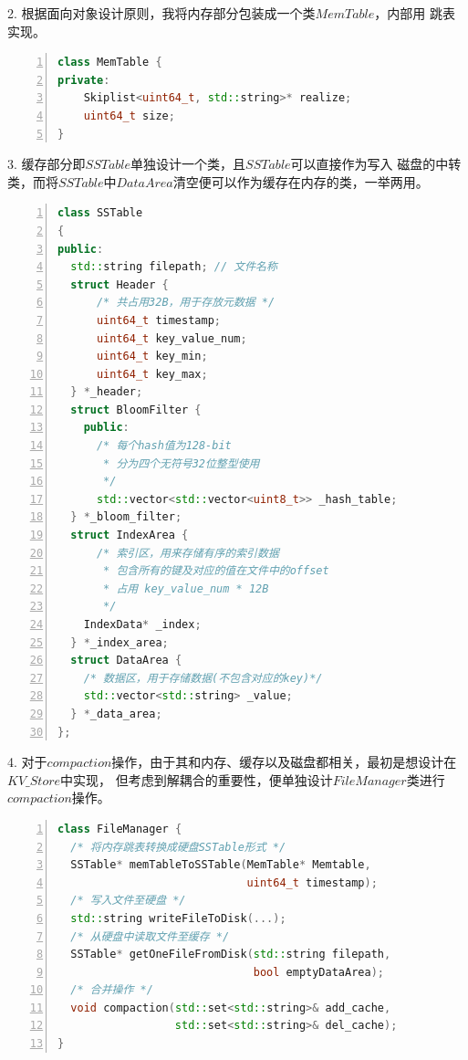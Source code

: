 \documentclass{article}
\begin{document}
2. 根据面向对象设计原则，我将内存部分包装成一个类$MemTable$，内部用
跳表实现。
\begin{lstlisting}[language = C++, numbers=left, 
  numberstyle=\tiny, frame=single]
class MemTable {
private:
    Skiplist<uint64_t, std::string>* realize;
    uint64_t size;
}
\end{lstlisting}

3. 缓存部分即$SSTable$单独设计一个类，且$SSTable$可以直接作为写入
磁盘的中转类，而将$SSTable$中$DataArea$清空便可以作为缓存在内存的类，一举两用。
\begin{lstlisting}[language = C++, numbers=left, 
  numberstyle=\tiny,frame=single]
class SSTable
{
public:
  std::string filepath; // 文件名称
  struct Header {
      /* 共占用32B，用于存放元数据 */
      uint64_t timestamp;
      uint64_t key_value_num;
      uint64_t key_min;
      uint64_t key_max;
  } *_header;
  struct BloomFilter {
    public:
      /* 每个hash值为128-bit
       * 分为四个无符号32位整型使用
       */
      std::vector<std::vector<uint8_t>> _hash_table;
  } *_bloom_filter;
  struct IndexArea {
      /* 索引区，用来存储有序的索引数据
       * 包含所有的键及对应的值在文件中的offset
       * 占用 key_value_num * 12B
       */
    IndexData* _index;
  } *_index_area;
  struct DataArea {
    /* 数据区，用于存储数据(不包含对应的key)*/
    std::vector<std::string> _value;
  } *_data_area;
};
\end{lstlisting}

4. 对于$compaction$操作，由于其和内存、缓存以及磁盘都相关，最初是想设计在$KV\_Store$中实现，
但考虑到解耦合的重要性，便单独设计$FileManager$类进行$compaction$操作。
\begin{lstlisting}[language = C++, numbers=left, 
  numberstyle=\tiny,frame=single]
class FileManager {
  /* 将内存跳表转换成硬盘SSTable形式 */
  SSTable* memTableToSSTable(MemTable* Memtable,
                             uint64_t timestamp);
  /* 写入文件至硬盘 */
  std::string writeFileToDisk(...);
  /* 从硬盘中读取文件至缓存 */
  SSTable* getOneFileFromDisk(std::string filepath, 
                              bool emptyDataArea);
  /* 合并操作 */
  void compaction(std::set<std::string>& add_cache,
                  std::set<std::string>& del_cache);
}
\end{lstlisting}
\end{document}
